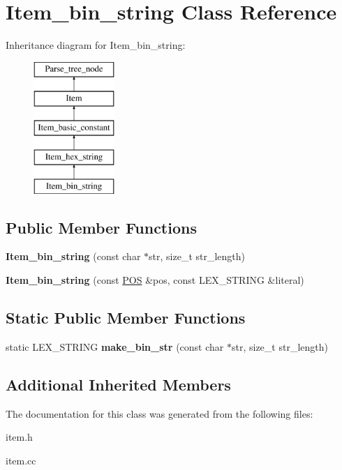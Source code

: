 \hypertarget{classItem__bin__string}{}\section{Item\+\_\+bin\+\_\+string Class Reference}
\label{classItem__bin__string}
Inheritance diagram for Item\+\_\+bin\+\_\+string\+:\begin{figure}[H]
\begin{center}
\leavevmode
\includegraphics[height=5.000000cm]{classItem__bin__string}
\end{center}
\end{figure}
\subsection*{Public Member Functions}
\begin{DoxyCompactItemize}
\item 
\mbox{\label{classItem__bin__string_a266bf98267f6ab5acb014e76645e9db7}} 
{\bfseries Item\+\_\+bin\+\_\+string} (const char $\ast$str, size\+\_\+t str\+\_\+length)
\item 
\mbox{\label{classItem__bin__string_aad3abf1aa0ec6ffa131df96df8525019}} 
{\bfseries Item\+\_\+bin\+\_\+string} (const \mbox{\hyperlink{structYYLTYPE}{P\+OS}} \&pos, const L\+E\+X\+\_\+\+S\+T\+R\+I\+NG \&literal)
\end{DoxyCompactItemize}
\subsection*{Static Public Member Functions}
\begin{DoxyCompactItemize}
\item 
\mbox{\label{classItem__bin__string_a9251773943f7e1cf6e7d7f0368778447}} 
static L\+E\+X\+\_\+\+S\+T\+R\+I\+NG {\bfseries make\+\_\+bin\+\_\+str} (const char $\ast$str, size\+\_\+t str\+\_\+length)
\end{DoxyCompactItemize}
\subsection*{Additional Inherited Members}


The documentation for this class was generated from the following files\+:\begin{DoxyCompactItemize}
\item 
item.\+h\item 
item.\+cc\end{DoxyCompactItemize}
